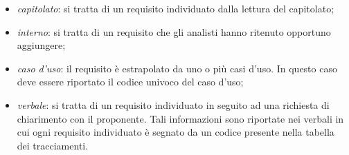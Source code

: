 \begin{itemize}
\begin{itemize}
					\item \textit{capitolato\glo}: si tratta di un requisito individuato dalla lettura del capitolato;
					\item \textit{interno}: si tratta di un requisito che gli analisti hanno ritenuto opportuno aggiungere;
					\item \textit{caso d'uso}: il requisito è estrapolato da uno o più casi d'uso. In questo caso deve essere riportato il codice univoco del caso d'uso;
					\item \textit{verbale}: si tratta di un requisito individuato in seguito ad una richiesta di chiarimento con il proponente. Tali informazioni sono riportate nei verbali in cui ogni requisito individuato è segnato da un codice presente nella tabella dei tracciamenti. \\
				\end{itemize}
			\end{itemize}
